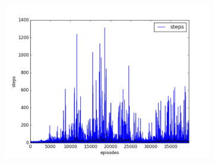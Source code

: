\begin{figure}[t]
  ~
  \begin{subfigure}[t]{\figscale\linewidth}
    \includegraphics[width=1.5\textwidth]
    {../results/maddpg_2vs1/steps.png}
    \label{fig:maddpg-2vs1-steps}
  \end{subfigure}


\end{figure}

